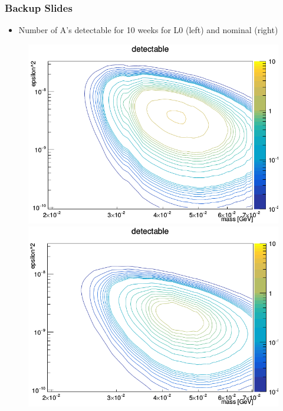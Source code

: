 \documentclass{beamer}
\begin{document}
\begin{frame}
\frametitle{Backup Slides}

\begin{itemize}
\item Number of A's detectable for 10 weeks for L0 (left) and nominal (right)
\end{itemize}

\begin{figure}
\includegraphics[width=0.5\linewidth]{figs/detectable_10_weeks_L0.png}
\includegraphics[width=0.5\linewidth]{figs/detectable_10_weeks_nom.png}
\end{figure}

\end{frame}

\end{document}
